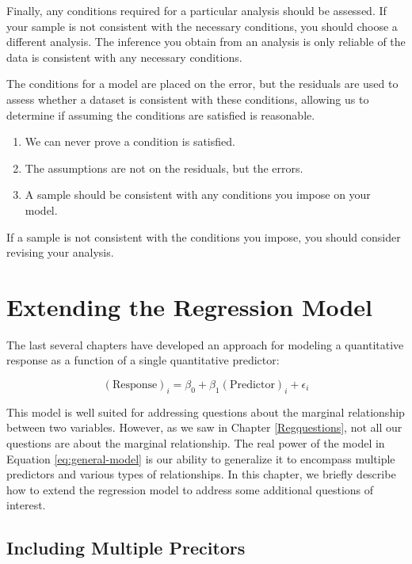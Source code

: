 \documentclass[]{book}
\providecommand{\tightlist}{%
  \setlength{\itemsep}{0pt}\setlength{\parskip}{0pt}}
\theoremstyle{plain}
\theoremstyle{mydefn}
\theoremstyle{myexmpl}
\theoremstyle{remark}
\let\BeginKnitrBlock\begin \let\EndKnitrBlock\end
\let\BeginKnitrBlock\begin \let\EndKnitrBlock\end
\begin{document}
Finally, any conditions required for a particular analysis should be
assessed. If your sample is not consistent with the necessary
conditions, you should choose a different analysis. The inference you
obtain from an analysis is only reliable of the data is consistent with
any necessary conditions.

\BeginKnitrBlock{rmdtip}
The conditions for a model are placed on the error, but the residuals
are used to assess whether a dataset is consistent with these
conditions, allowing us to determine if assuming the conditions are
satisfied is reasonable.

\begin{enumerate}
\def\labelenumi{\arabic{enumi}.}
\tightlist
\item
  We can never prove a condition is satisfied.
\item
  The assumptions are not on the residuals, but the errors.
\item
  A sample should be consistent with any conditions you impose on your
  model.
\end{enumerate}

If a sample is not consistent with the conditions you impose, you should
consider revising your analysis.
\EndKnitrBlock{rmdtip}

\chapter{Extending the Regression Model}\label{Regextensions}

The last several chapters have developed an approach for modeling a
quantitative response as a function of a single quantitative predictor:

\[(\text{Response})_i = \beta_0 + \beta_1 (\text{Predictor})_i + \epsilon_i\]

This model is well suited for addressing questions about the marginal
relationship between two variables. However, as we saw in Chapter
\ref{Regquestions}, not all our questions are about the marginal
relationship. The real power of the model in Equation
\eqref{eq:general-model} is our ability to generalize it to encompass
multiple predictors and various types of relationships. In this chapter,
we briefly describe how to extend the regression model to address some
additional questions of interest.

\section{Including Multiple
Precitors}\label{including-multiple-precitors}
\end{document}
